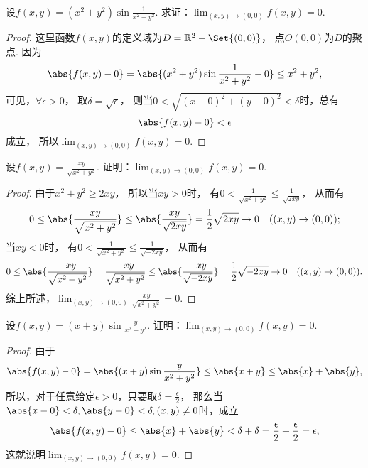 \begin{example}
设\(f(x,y) = (x^2+y^2) \sin\frac1{x^2+y^2}\).
求证：\(\lim_{(x,y)\to(0,0)} f(x,y) = 0\).
\begin{proof}
这里函数\(f(x,y)\)的定义域为\(D = \mathbb{R}^2 - \Set{(0,0)}\)，
点\(O(0,0)\)为\(D\)的聚点.
因为\[
	\abs{f(x,y)-0}
	= \abs{(x^2+y^2) \sin\frac1{x^2+y^2} - 0}
	\leq x^2+y^2,
\]
可见，\(\forall\epsilon>0\)，
取\(\delta=\sqrt{\epsilon}\)，
则当\(0 < \sqrt{(x-0)^2+(y-0)^2} < \delta\)时，总有\[
	\abs{f(x,y)-0} < \epsilon
\]成立，
所以\(\lim_{(x,y)\to(0,0)} f(x,y) = 0\).
\end{proof}
\end{example}

\begin{example}
设\(f(x,y) = \frac{xy}{\sqrt{x^2+y^2}}\).
证明：\(\lim_{(x,y)\to(0,0)} f(x,y) = 0\).
\begin{proof}
由于\(x^2+y^2 \geq 2xy\)，
所以当\(xy>0\)时，
有\(0 < \frac1{\sqrt{x^2+y^2}} \leq \frac1{\sqrt{2xy}}\)，
从而有\begin{equation*}
	0 \leq \abs{\frac{xy}{\sqrt{x^2+y^2}}}
	\leq \abs{\frac{xy}{\sqrt{2xy}}}
	= \frac12 \sqrt{2xy}
	\to0
	\quad((x,y)\to(0,0));
\end{equation*}
当\(xy<0\)时，
有\(0 < \frac1{\sqrt{x^2+y^2}} \leq \frac1{\sqrt{-2xy}}\)，
从而有\begin{equation*}
	0 \leq \abs{\frac{-xy}{\sqrt{x^2+y^2}}}
	= \frac{-xy}{\sqrt{x^2+y^2}}
	\leq \abs{\frac{-xy}{\sqrt{-2xy}}}
	= \frac12 \sqrt{-2xy}
	\to0
	\quad((x,y)\to(0,0)).
\end{equation*}
综上所述，\(\lim_{(x,y)\to(0,0)} \frac{xy}{\sqrt{x^2+y^2}} = 0\).
\end{proof}
\end{example}

\begin{example}
设\(f(x,y) = (x+y) \sin\frac{y}{x^2+y^2}\).
证明：\(\lim_{(x,y)\to(0,0)} f(x,y) = 0\).
\begin{proof}
由于\[
	\abs{f(x,y)-0}
	= \abs{(x+y) \sin\frac{y}{x^2+y^2}}
	\leq \abs{x+y}
	\leq \abs{x}+\abs{y},
\]
所以，对于任意给定\(\epsilon>0\)，只要取\(\delta=\frac\epsilon2\)，
那么当\(\abs{x-0}<\delta,\abs{y-0}<\delta,(x,y)\neq0\)时，成立\[
	\abs{f(x,y)-0}
	\leq \abs{x}+\abs{y}
	< \delta+\delta
	= \frac\epsilon2+\frac\epsilon2
	= \epsilon,
\]
这就说明\(\lim_{(x,y)\to(0,0)} f(x,y) = 0\).
\end{proof}
\end{example}

